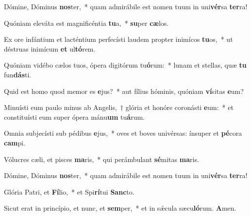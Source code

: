 \item Dómine, Dóminus \textbf{nos}ter,~* quam admirábile est nomen tuum in uni\textbf{vér}sa \textbf{ter}ra!
\item Quóniam eleváta est magnificéntia \textbf{tu}a,~* \textbf{su}per \textbf{cæ}los.
\item Ex ore infántium et lacténtium perfecísti laudem propter inimícos \textbf{tu}os,~* ut déstruas inimícum \textbf{et} ul\textbf{tó}rem.
\item Quóniam vidébo cælos tuos, ópera digitórum tu\textbf{ó}rum:~* lunam et stellas, quæ \textbf{tu} fun\textbf{dás}ti.
\item Quid est homo quod memor es \textbf{e}jus?~* aut fílius hóminis, quóniam \textbf{ví}sitas \textbf{e}um?
\item Minuísti eum paulo minus ab Angelis,~† glória et honóre coronásti \textbf{e}um:~* et constituísti eum super ópera mánu\textbf{um} tu\textbf{á}rum.
\item Omnia subjecísti sub pédibus \textbf{e}jus,~* oves et boves univérsas: ínsuper et \textbf{pé}cora \textbf{cam}pi.
\item Vólucres cæli, et pisces \textbf{ma}ris,~* qui perámbulant \textbf{sé}mitas \textbf{ma}ris.
\item Dómine, Dóminus \textbf{nos}ter,~* quam admirábile est nomen tuum in uni\textbf{vér}sa \textbf{ter}ra!
\item Glória Patri, et \textbf{Fí}lio,~* et Spi\textbf{rí}tui \textbf{Sanc}to.
\item Sicut erat in princípio, et nunc, et \textbf{sem}per,~* et in sǽcula sæcu\textbf{ló}rum. \textbf{A}men.
